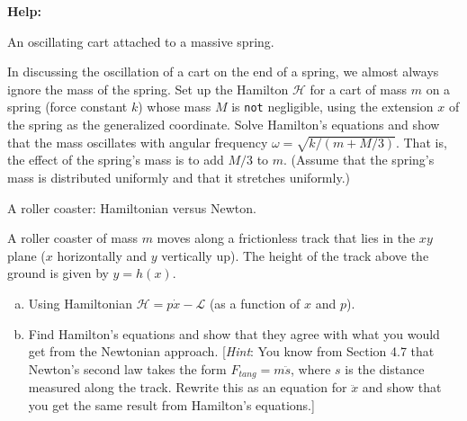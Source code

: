 \documentclass[11pt,letterpaper,boxed]{../hmcpsetrhino}
\def\Lagr{\mathcal{L}}
\def\Ham{\mathcal{H}}
\begin{document}
\textbf{Help:}

\begin{problem}[i]
An oscillating cart attached to a massive spring.

\begin{problem}[13.6]
In discussing the oscillation of a cart on the end of a spring, we almost always ignore the mass of the spring. Set up the Hamilton $\Ham$ for a cart of mass $m$ on a spring (force constant $k$) whose mass $M$ is \texttt{not} negligible, using the extension $x$ of the spring as the generalized coordinate. Solve Hamilton's equations and show that the mass oscillates with angular frequency $\omega = \sqrt{k/(m + M/3)}$. That is, the effect of the spring's mass is to add $M/3$ to $m$. (Assume that the spring's mass is distributed uniformly and that it stretches uniformly.)
\end{problem}
\end{problem}
\begin{solution}


\vfill
\end{solution}


\newpage

\begin{problem}[ii]
A roller coaster: Hamiltonian versus Newton.

\begin{problem}[13.7]
A roller coaster of mass $m$ moves along a frictionless track that lies in the $x y$ plane ($x$ horizontally and $y$ vertically up). The height of the track above the ground is given by $y = h(x)$. 
\begin{enumerate}[(a)]
\item Using Hamiltonian $\Ham = p\dot x - \Lagr$ (as a function of $x$ and $p$).

\item Find Hamilton's equations and show that they agree with what you would get from the Newtonian approach. [\textit{Hint}: You know from Section 4.7 that Newton's second law takes the form $F_{tang} = m \ddot s$, where $s$ is the distance measured along the track. Rewrite this as an equation for $\ddot x$ and show that you get the same result from Hamilton's equations.]
\end{enumerate}
\end{problem}
\end{problem}
\begin{solution}


\vfill
\end{solution}
\end{document}
